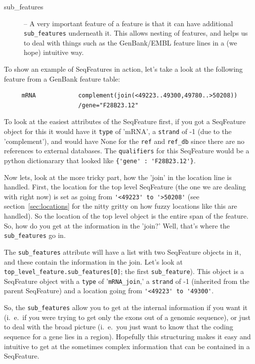 \documentclass{report}
\begin{document}
\begin{description}
  \item[sub\_features] -- A very important feature of a feature is that it can have additional \verb|sub_features| underneath it. This allows nesting of features, and helps us to deal with things such as the GenBank/EMBL feature lines in a (we hope) intuitive way.
\end{description}

To show an example of SeqFeatures in action, let's take a look at the following feature from a GenBank feature table:

\begin{verbatim}
     mRNA            complement(join(<49223..49300,49780..>50208))
                     /gene="F28B23.12"
\end{verbatim}

To look at the easiest attributes of the SeqFeature first, if you got a SeqFeature object for this it would have it \verb|type| of 'mRNA', a \verb|strand| of -1 (due to the 'complement'), and would have None for the \verb|ref| and \verb|ref_db| since there are no references to external databases. The \verb|qualifiers| for this SeqFeature would be a python dictionarary that looked like \verb|{'gene' : 'F28B23.12'}|.


Now lets, look at the more tricky part, how the 'join' in the location 
line is handled. First, the location for the top level SeqFeature (the 
one we are dealing with right now) is set as going from 
\verb|'<49223' to '>50208'| (see section~\ref{sec:locations} for 
the nitty gritty on how fuzzy locations like this are handled). 
So the location of the top level object is the entire span of the 
feature. So, how do you get at the information in the 'join?' 
Well, that's where the \verb|sub_features| go in.



The \verb|sub_features| attribute will have a list with two SeqFeature 
objects in it, and these contain the information in the join. Let's 
look at \verb|top_level_feature.sub_features[0]|; the first 
\verb|sub_feature|). This object is a SeqFeature object with a 
\verb|type| of '\verb|mRNA_join|,' a \verb|strand| of -1 (inherited 
from the parent SeqFeature) and a location going from 
\verb|'<49223' to '49300'|. 


So, the \verb|sub_features| allow you to get at the internal information if you want it (i.~e.~if you were trying to get only the exons out of a genomic sequence), or just to deal with the broad picture (i.~e.~you just want to know that the coding sequence for a gene lies in a region). Hopefully this structuring makes it easy and intuitive to get at the sometimes complex information that can be contained in a SeqFeature.
\end{document}
